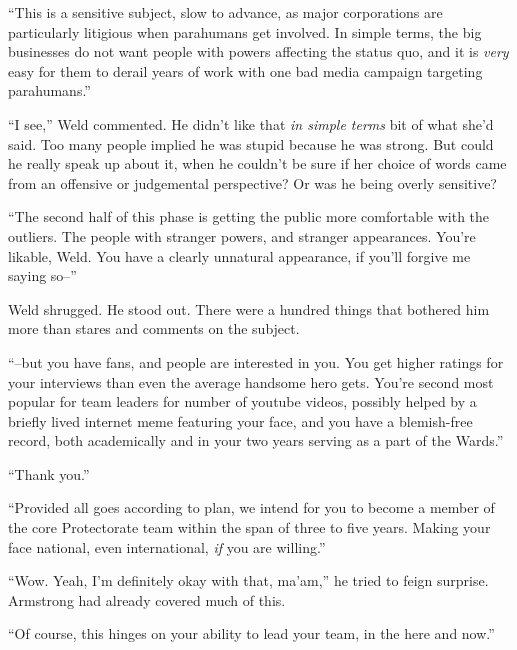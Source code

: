 ``This is a sensitive subject, slow to advance, as major corporations are particularly litigious when parahumans get involved.  In simple terms, the big businesses do not want people with powers affecting the status quo, and it is \emph{very} easy for them to derail years of work with one bad media campaign targeting parahumans.''



``I see,'' Weld commented.  He didn't like that \emph{in simple terms} bit of what she'd said.  Too many people implied he was stupid because he was strong.  But could he really speak up about it, when he couldn't be sure if her choice of words came from an offensive or judgemental perspective?  Or was he being overly sensitive?



``The second half of this phase is getting the public more comfortable with the outliers.  The people with stranger powers, and stranger appearances.  You're likable, Weld.  You have a clearly unnatural appearance, if you'll forgive me saying so--''



Weld shrugged.  He stood out.  There were a hundred things that bothered him more than stares and comments on the subject.



``--but you have fans, and people are interested in you.  You get higher ratings for your interviews than even the average handsome hero gets.  You're second most popular for team leaders for number of youtube videos, possibly helped by a briefly lived internet meme featuring your face, and you have a blemish-free record, both academically and in your two years serving as a part of the Wards.''



``Thank you.''



``Provided all goes according to plan, we intend for you to become a member of the core Protectorate team within the span of three to five years.  Making your face national, even international,\emph{ if} you are willing.''



``Wow.  Yeah, I'm definitely okay with that, ma'am,'' he tried to feign surprise.  Armstrong had already covered much of this.



``Of course, this hinges on your ability to lead your team, in the here and now.''



